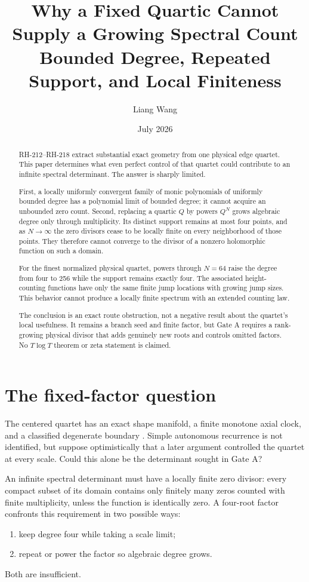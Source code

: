 \documentclass[12pt]{article}
\title{Why a Fixed Quartic Cannot Supply a Growing Spectral Count\\
\large Bounded Degree, Repeated Support, and Local Finiteness}
\author{Liang Wang}\date{July 2026}
\theoremstyle{remark}\newtheorem{remark}[theorem]{Remark}
\begin{document}
\maketitle
\begin{abstract}
RH-212--RH-218 extract substantial exact geometry from one physical edge
quartet.  This paper determines what even perfect control of that quartet
could contribute to an infinite spectral determinant.  The answer is sharply
limited.

First, a locally uniformly convergent family of monic polynomials of uniformly
bounded degree has a polynomial limit of bounded degree; it cannot acquire an
unbounded zero count.  Second, replacing a quartic $Q$ by powers $Q^N$ grows
algebraic degree only through multiplicity.  Its distinct support remains at
most four points, and as $N\to\infty$ the zero divisors cease to be locally
finite on every neighborhood of those points.  They therefore cannot
converge to the divisor of a nonzero holomorphic function on such a domain.

For the finest normalized physical quartet, powers through $N=64$ raise the
degree from four to 256 while the support remains exactly four.  The associated
height-counting functions have only the same finite jump locations with
growing jump sizes.  This behavior cannot produce a locally finite spectrum
with an extended counting law.

The conclusion is an exact route obstruction, not a negative result about
the quartet's local usefulness.  It remains a branch seed and finite factor,
but Gate A requires a rank-growing physical divisor that adds genuinely new
roots and controls omitted factors.  No $T\log T$ theorem or zeta statement is
claimed.
\end{abstract}

\section{The fixed-factor question}

The centered quartet has an exact shape manifold, a finite monotone axial
clock, and a classified degenerate boundary
\citep{WangRH213,WangRH214,WangRH216}.  Simple autonomous recurrence is not
identified, but suppose optimistically that a later argument controlled the
quartet at every scale.  Could this alone be the determinant sought in Gate
A?

An infinite spectral determinant must have a locally finite zero divisor:
every compact subset of its domain contains only finitely many zeros counted
with finite multiplicity, unless the function is identically zero.  A
four-root factor confronts this requirement in two possible ways:
\begin{enumerate}[leftmargin=2em]
\item keep degree four while taking a scale limit;
\item repeat or power the factor so algebraic degree grows.
\end{enumerate}
Both are insufficient.
\end{document}
